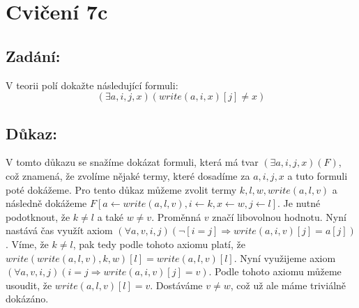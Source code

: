 \documentclass{article}
\begin{document}
\section{Cvičení 7c}

\subsection{Zadání:}

V teorii polí dokažte následující formuli:
$$(\exists a,i,j,x )(write(a,i,x)[j] \neq x)$$


\subsection{Důkaz:}
V tomto důkazu se snažíme dokázat formuli, která má tvar $(\exists a,i,j,x)(F)$, což znamená, že zvolíme nějaké termy, které dosadíme za $a,i,j,x$ a tuto formuli poté dokážeme. Pro tento důkaz můžeme zvolit termy $k,l,w,write(a,l,v)$ a následně dokážeme $F[a \leftarrow write(a,l,v), i \leftarrow k, x \leftarrow w, j \leftarrow l]$. Je nutné podotknout, že $k \neq l$ a také $w \neq v$. Proměnná $v$ značí libovolnou hodnotu. Nyní nastává čas využít axiom $(\forall a, v, i, j ) ( \neg [i = j] \Rightarrow write(a, i, v)[j] = a[j])$. Víme, že $k \neq l$, pak tedy podle tohoto axiomu platí, že $write(write(a,l,v),k,w)[l] = write(a,l,v)[l]$. Nyní využijeme axiom $(\forall a, v, i, j) ( i = j \Rightarrow write(a, i, v)[j] = v)$. Podle tohoto axiomu můžeme usoudit, že $write(a,l,v)[l] = v$. Dostáváme $v \neq w$, což už ale máme triviálně dokázáno.
\end{document}
